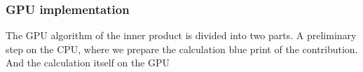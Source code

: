 \documentclass[oribibl]{llncs2e/llncs}
\begin{document}




\subsubsection{GPU implementation}

The GPU algorithm of the inner product is divided into two parts. A preliminary step on the CPU,  where we prepare the calculation blue print of the  contribution. And the calculation itself on the GPU
\end{document}
